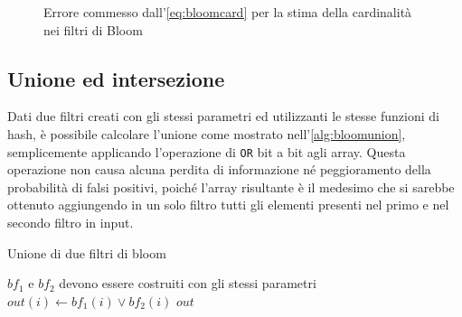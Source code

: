 \begin{figure}
\begin{minipage}[c]{0.7\textwidth}
{		}
	\end{minipage}
	\qquad
	\begin{minipage}[c]{0.7\textwidth}
	\end{minipage}

	\caption{Errore commesso dall'\autoref{eq:bloomcard} per la stima della car\-di\-na\-li\-tà nei
	filtri di Bloom}
	\label{fig:bloomerror}
\end{figure}

\subsection{Unione ed intersezione}

Dati due filtri creati con gli stessi parametri ed utilizzanti le stesse funzioni di hash, è
possibile calcolare l'unione come mostrato nell'\autoref{alg:bloomunion}, semplicemente applicando
l'operazione di \verb|OR| bit a bit agli array. Questa operazione non causa alcuna perdita di
informazione né peggioramento della probabilità di falsi positivi, poiché l'array risultante è il
medesimo che si sarebbe ottenuto aggiungendo in un solo filtro tutti gli elementi presenti nel primo
e nel secondo filtro in input.

\begin{algorithm}
\caption{Unione di due filtri di bloom}
\label{alg:bloomunion}
\begin{algorithmic}[1]
\Require $bf_1$ e $bf_2$ devono essere costruiti con gli stessi pa\-ra\-me\-tri
		\State $out(i) \gets bf_1(i) \lor bf_2(i)$
	\EndFor
	\State \Return $out$
\EndProcedure
\end{algorithmic}
\end{algorithm}



